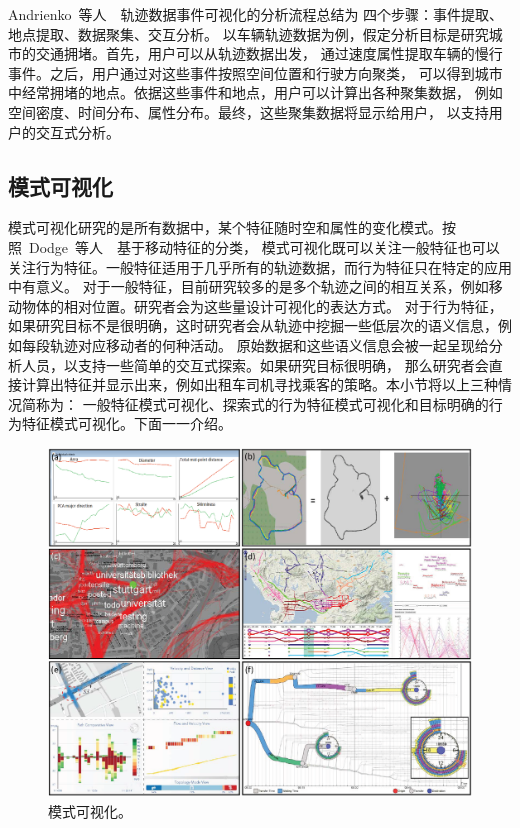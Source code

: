 \documentclass[12pt,twocolumn]{article}
\begin{document}
Andrienko~等人~\citep{AndrienkoAHRW2013}~轨迹数据事件可视化的分析流程总结为
四个步骤：事件提取、地点提取、数据聚集、交互分析。
以车辆轨迹数据为例，假定分析目标是研究城市的交通拥堵。首先，用户可以从轨迹数据出发，
通过速度属性提取车辆的慢行事件。之后，用户通过对这些事件按照空间位置和行驶方向聚类，
可以得到城市中经常拥堵的地点。依据这些事件和地点，用户可以计算出各种聚集数据，
例如空间密度、时间分布、属性分布。最终，这些聚集数据将显示给用户，
以支持用户的交互式分析。

\subsection{模式可视化}
\label{subsection:extraction_behavior}

模式可视化研究的是所有数据中，某个特征随时空和属性的变化模式。按照~Dodge~等人~\citep{DodgeWL2008}~基于移动特征的分类，
模式可视化既可以关注一般特征也可以关注行为特征。一般特征适用于几乎所有的轨迹数据，而行为特征只在特定的应用中有意义。
对于一般特征，目前研究较多的是多个轨迹之间的相互关系，例如移动物体的相对位置。研究者会为这些量设计可视化的表达方式。
对于行为特征，如果研究目标不是很明确，这时研究者会从轨迹中挖掘一些低层次的语义信息，例如每段轨迹对应移动者的何种活动。
原始数据和这些语义信息会被一起呈现给分析人员，以支持一些简单的交互式探索。如果研究目标很明确，
那么研究者会直接计算出特征并显示出来，例如出租车司机寻找乘客的策略。本小节将以上三种情况简称为：
一般特征模式可视化、探索式的行为特征模式可视化和目标明确的行为特征模式可视化。下面一一介绍。

\begin{figure}[!htb]
\centering
\includegraphics[width=0.85\linewidth]{images/extraction_pattern.eps}
\caption{\label{fig:extraction_pattern}模式可视化。
}
\end{figure}
\end{document}
